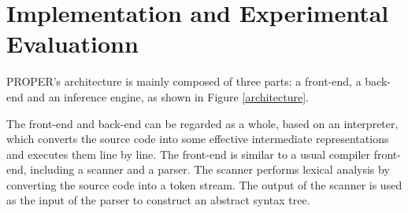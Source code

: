 \documentclass[conference]{IEEEtran}
\begin{document}
\section{Implementation and Experimental Evaluationn}
PROPER's architecture is mainly composed of three parts: a front-end, a back-end and an inference engine, as shown in Figure \ref{architecture}.  

The front-end and back-end can be regarded as a whole, based on an interpreter, which converts the source code into some effective intermediate representations and executes them line by line. The front-end is similar to a usual compiler front-end, including a scanner and a parser. The scanner performs lexical analysis by converting the  source code  into a token stream.  The output of the scanner is used as the input of the parser to construct an abstract syntax tree.
\end{document}
